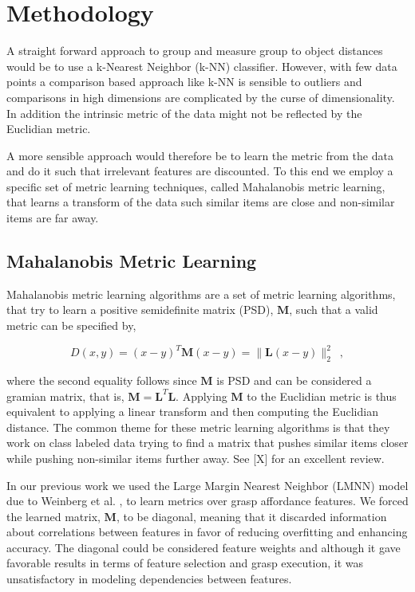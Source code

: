 \section{Methodology}\label{methodology}

A straight forward approach to group and measure group to object
distances would be to use a k-Nearest Neighbor (k-NN) classifier.
However, with few data points a comparison based approach like k-NN is
sensible to outliers and comparisons in high dimensions are complicated
by the curse of dimensionality. In addition the intrinsic metric of the
data might not be reflected by the Euclidian metric.

A more sensible approach would therefore be to learn the metric from the
data and do it such that irrelevant features are discounted. To this end
we employ a specific set of metric learning techniques, called
Mahalanobis metric learning, that learns a transform of the data such
similar items are close and non-similar items are far away.

\subsection{Mahalanobis Metric
Learning}\label{mahalanobis-metric-learning}

Mahalanobis metric learning algorithms are a set of metric learning
algorithms, that try to learn a positive semidefinite matrix (PSD),
\(\mathbf{M}\), such that a valid metric can be specified by,

\begin{equation}
    D(x,y) = (x-y)^{T} \mathbf{M} (x-y) = \parallel \mathbf{L}(x-y) \parallel^{2}_{2} \enspace ,
\end{equation}

where the second equality follows since \(\mathbf{M}\) is PSD and can be
considered a gramian matrix, that is,
\(\mathbf{M}=\mathbf{L}^{T}\mathbf{L}\). Applying \(\mathbf{M}\) to the
Euclidian metric is thus equivalent to applying a linear transform and
then computing the Euclidian distance. The common theme for these metric
learning algorithms is that they work on class labeled data trying to
find a matrix that pushes similar items closer while pushing non-similar
items further away. See {[}X{]} for an excellent review.

In our previous work \cite{Hjelm:2015hw} we used the Large Margin
Nearest Neighbor (LMNN) model due to Weinberg et al.
\cite{Weinberger:2009to}, to learn metrics over grasp affordance
features. We forced the learned matrix, \(\mathbf{M}\), to be diagonal,
meaning that it discarded information about correlations between
features in favor of reducing overfitting and enhancing accuracy. The
diagonal could be considered feature weights and although it gave
favorable results in terms of feature selection and grasp execution, it
was unsatisfactory in modeling dependencies between features.


